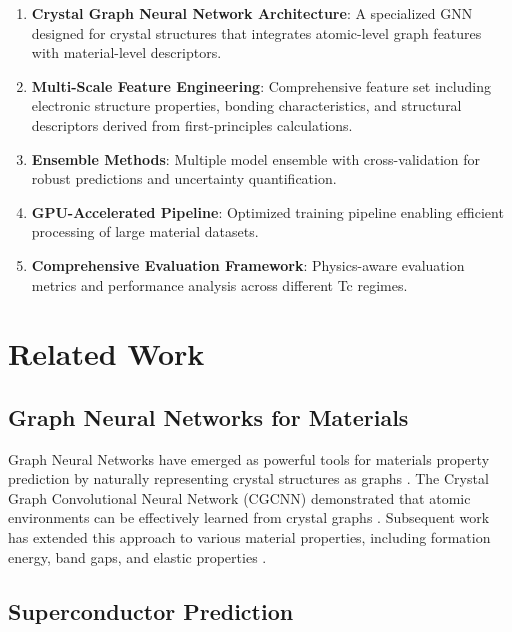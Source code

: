 \documentclass[11pt,a4paper]{article}
\begin{document}
\begin{enumerate}
    \item \textbf{Crystal Graph Neural Network Architecture}: A specialized GNN designed for crystal structures that integrates atomic-level graph features with material-level descriptors.
    
    \item \textbf{Multi-Scale Feature Engineering}: Comprehensive feature set including electronic structure properties, bonding characteristics, and structural descriptors derived from first-principles calculations.
    
    \item \textbf{Ensemble Methods}: Multiple model ensemble with cross-validation for robust predictions and uncertainty quantification.
    
    \item \textbf{GPU-Accelerated Pipeline}: Optimized training pipeline enabling efficient processing of large material datasets.
    
    \item \textbf{Comprehensive Evaluation Framework}: Physics-aware evaluation metrics and performance analysis across different Tc regimes.
\end{enumerate}

\section{Related Work}

\subsection{Graph Neural Networks for Materials}

Graph Neural Networks have emerged as powerful tools for materials property prediction by naturally representing crystal structures as graphs \citep{xie2018crystal}. The Crystal Graph Convolutional Neural Network (CGCNN) demonstrated that atomic environments can be effectively learned from crystal graphs \citep{xie2018crystal}. Subsequent work has extended this approach to various material properties, including formation energy, band gaps, and elastic properties \citep{chen2019graph, park2017developing}.

\subsection{Superconductor Prediction}
\end{document}
